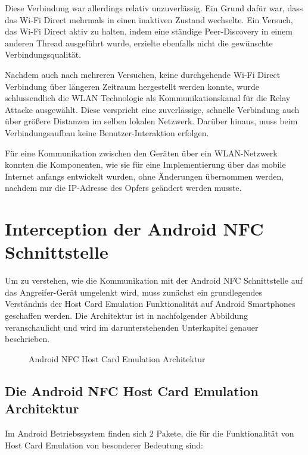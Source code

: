 Diese Verbindung war allerdings relativ unzuverlässig. Ein Grund dafür war, dass das Wi-Fi Direct mehrmals in einen inaktiven Zustand wechselte. Ein Versuch, das Wi-Fi Direct aktiv zu halten, indem eine ständige Peer-Discovery in einem anderen Thread ausgeführt wurde, erzielte ebenfalls nicht die gewünschte Verbindungsqualität. 

Nachdem auch nach mehreren Versuchen, keine durchgehende Wi-Fi Direct Verbindung über längeren Zeitraum hergestellt werden konnte, wurde schlussendlich die WLAN Technologie als Kommunikationskanal für die Relay Attacke ausgewählt. Diese verspricht eine zuverlässige, schnelle Verbindung auch über größere Distanzen im selben lokalen Netzwerk. Darüber hinaus, muss beim Verbindungsaufbau keine Benutzer-Interaktion erfolgen. 

Für eine Kommunikation zwischen den Geräten über ein WLAN-Netzwerk konnten die Komponenten, wie sie für eine Implementierung über das mobile Internet anfangs entwickelt wurden, ohne Änderungen übernommen werden, nachdem nur die IP-Adresse des Opfers geändert werden musste. 

\section{Interception der Android NFC Schnittstelle}

Um zu verstehen, wie die Kommunikation mit der Android NFC Schnittstelle auf das Angreifer-Gerät umgelenkt wird, muss zunächst ein grundlegendes Verständnis der Host Card Emulation Funktionalität auf Android Smartphones geschaffen werden. Die Architektur ist in nachfolgender Abbildung veranschaulicht und wird im darunterstehenden Unterkapitel genauer beschrieben. 

\begin{figure}
	\caption{Android NFC Host Card Emulation Architektur}
\end{figure}

\subsection{Die Android NFC Host Card Emulation Architektur}

Im Android Betriebssystem finden sich 2 Pakete, die für die Funktionalität von Host Card Emulation von besonderer Bedeutung sind: 

